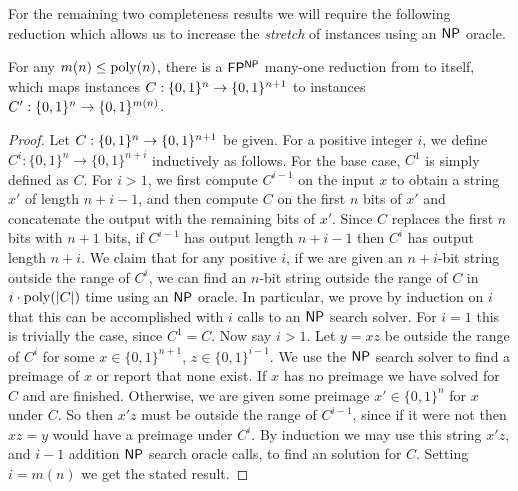 For the remaining two completeness results we will require the following reduction which allows us to increase the \emph{stretch} of \avoid instances using an $\cl{NP}$ oracle. 
\begin{lemma}\label{lem:swapping-sizes}
For any $m(n) \leq \mathrm{poly}(n)$, there is a $\cl{FP^{NP}}$ many-one reduction from \avoid to itself, which maps instances $C: \{0,1\}^n \to \{0,1\}^{n+1}$ to instances $C': \{0,1\}^n \to \{0,1\}^{m(n)}$.
\end{lemma}
\begin{proof}
Let $C: \{0,1\}^n \to \{0,1\}^{n+1}$ be given. For a positive integer $i$, we define $C^i: \{0,1\}^n \rightarrow \{0,1\}^{n + i}$ inductively as follows. For the base case, $C^1$ is simply defined as $C$. For $i > 1$, we first compute $C^{i-1}$ on the input $x$ to obtain a string $x'$ of length $n + i - 1$, and then compute $C$ on the first $n$ bits of $x'$ and concatenate the output with the remaining bits of $x'$. Since $C$ replaces the first $n$ bits with $n+1$ bits, if $C^{i-1}$ has output length $n + i-1$ then $C^i$ has output length $n + i$. We claim that for any positive $i$, if we are given an $n+i$-bit string outside the range of $C^i$, we can find an $n$-bit string outside the range of $C$ in $i \cdot \mathrm{poly}(|C|)$ time using an $\cl{NP}$ oracle. In particular, we prove by induction on $i$ that this can be accomplished with $i$ calls to an $\cl{NP}$ search solver. For $i=1$ this is trivially the case, since $C^1=C$. Now say $i > 1$. Let $y = xz$ be outside the range of $C^i$ for some $x \in \{0,1\}^{n+1}$, $z \in \{0,1\}^{i-1}$. We use the $\cl{NP}$ search solver to find a preimage of $x$ or report that none exist. If $x$ has no preimage we have solved \avoid for $C$ and are finished. Otherwise, we are given some preimage $x' \in \{0,1\}^n$ for $x$ under $C$. So then $x'z$ must be outside the range of $C^{i-1}$, since if it were not then $xz=y$ would have a preimage under $C^i$. By induction we may use this string $x'z$, and $i-1$ addition $\cl{NP}$ search oracle calls, to find an \avoid solution for $C$. Setting $i = m(n)$ we get the stated result.
\end{proof}

